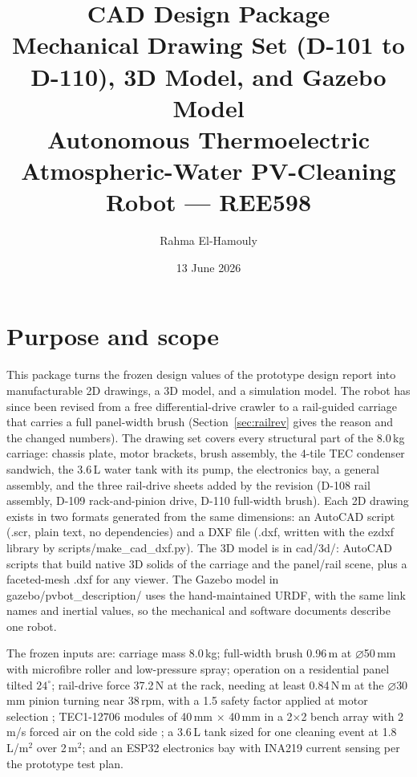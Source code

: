 \documentclass[11pt,a4paper]{article}
\title{\textbf{CAD Design Package}\\[0.4em]
\large Mechanical Drawing Set (D-101 to D-110), 3D Model, and Gazebo Model\\[0.2em]
\normalsize Autonomous Thermoelectric Atmospheric-Water PV-Cleaning Robot --- REE598}
\author{Rahma El-Hamouly}
\date{13 June 2026}
\newcommand{\fpath}[1]{{\ttfamily\small #1}}
\begin{document}
\maketitle

\section{Purpose and scope}
This package turns the frozen design values of the prototype design report
into manufacturable 2D drawings, a 3D model, and a simulation model. The robot
has since been revised from a free differential-drive crawler to a rail-guided
carriage that carries a full panel-width brush (Section~\ref{sec:railrev}
gives the reason and the changed numbers). The drawing set covers every
structural part of the 8.0\,kg carriage: chassis plate, motor brackets, brush
assembly, the 4-tile TEC condenser sandwich, the 3.6\,L water tank with its
pump, the electronics bay, a general assembly, and the three rail-drive sheets
added by the revision (D-108 rail assembly, D-109 rack-and-pinion drive, D-110
full-width brush). Each 2D drawing exists in two formats generated from the
same dimensions: an AutoCAD script (\fpath{.scr}, plain text, no dependencies)
and a DXF file (\fpath{.dxf}, written with the \fpath{ezdxf} library by
\fpath{scripts/make\_cad\_dxf.py}). The 3D model is in \fpath{cad/3d/}:
AutoCAD scripts that build native 3D solids of the carriage and the panel/rail
scene, plus a faceted-mesh \fpath{.dxf} for any viewer. The Gazebo model in
\fpath{gazebo/pvbot\_description/} uses the hand-maintained URDF, with the same
link names and inertial values, so the mechanical and software documents
describe one robot.

The frozen inputs are: carriage mass 8.0\,kg; full-width brush 0.96\,m at
$\varnothing$50\,mm with microfibre roller and low-pressure spray; operation
on a residential panel tilted $24^\circ$; rail-drive force 37.2\,N at the
rack, needing at least 0.84\,N\,m at the $\varnothing$30\,mm pinion turning
near 38\,rpm, with a 1.5 safety factor applied at motor selection
\cite{siegwart2011mobilerobots};
TEC1-12706 modules of 40\,mm $\times$ 40\,mm \cite{tec12706ds} in a
2$\times$2 bench array with 2\,m/s forced air on the cold side
\cite{zhao2022teccondenser}; a 3.6\,L tank sized for one cleaning event at
1.8\,L/m$^2$ over 2\,m$^2$; and an ESP32 electronics bay with INA219 current
sensing per the prototype test plan.
\end{document}
